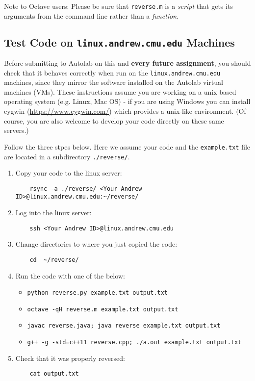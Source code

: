 \documentclass[12pt]{article}
\begin{document}
{\color{red} 
Note to Octave users: Please be sure that \texttt{reverse.m} is a \textit{script} that gets its arguments from the command line rather than a \textit{function}.}

\subsection{Test Code on \texttt{linux.andrew.cmu.edu} Machines}

Before submitting to Autolab on this and \textbf{every future assignment}, you should check that it behaves correctly when run on the \texttt{linux.andrew.cmu.edu} machines, since they mirror the software installed on the Autolab virtual machines (VMs). These instructions assume you are working on a unix based operating system (e.g. Linux, Mac OS) - if you are using Windows you can install cygwin (\url{https://www.cygwin.com/}) which provides a unix-like environment. (Of course, you are also welcome to develop your code directly on these same servers.)

Follow the three stpes below. Here we assume your code and the \texttt{example.txt} file are located in a subdirectory \texttt{./reverse/}.

\begin{enumerate}
    \item Copy your code to the linux server:
    \begin{verbatim}
    rsync -a ./reverse/ <Your Andrew ID>@linux.andrew.cmu.edu:~/reverse/\end{verbatim}
    
    \item Log into the linux server:
    \begin{verbatim}
    ssh <Your Andrew ID>@linux.andrew.cmu.edu\end{verbatim}
    
    \item Change directories to where you just copied the code:
    \begin{verbatim}
    cd  ~/reverse/\end{verbatim}
    
    \item Run the code with one of the below:
    \begin{itemize}
        \item \texttt{python reverse.py example.txt output.txt}
        \item \texttt{octave -qH reverse.m example.txt output.txt}
        \item \texttt{javac reverse.java; java reverse example.txt output.txt}
        \item \texttt{g++ -g -std=c++11 reverse.cpp; ./a.out example.txt output.txt}
    \end{itemize}
    
    \item Check that it was properly reversed:
    \begin{verbatim}
    cat output.txt\end{verbatim}
\end{enumerate}
\end{document}
